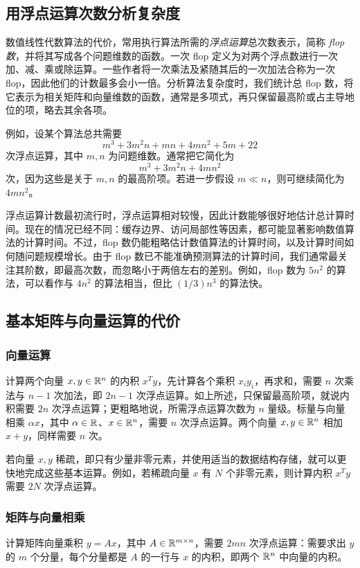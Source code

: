 \subsection{用浮点运算次数分析复杂度}
数值线性代数算法的代价，常用执行算法所需的\emph{浮点运算}总次数表示，简称 \emph{flop 数}，并将其写成各个问题维数的函数。一次 flop 定义为对两个浮点数进行一次加、减、乘或除运算。一些作者将一次乘法及紧随其后的一次加法合称为一次 flop，因此他们的计数最多会小一倍。分析算法复杂度时，我们统计总 flop 数，将它表示为相关矩阵和向量维数的函数，通常是多项式，再只保留最高阶或占主导地位的项，略去其余各项。

例如，设某个算法总共需要
\[
 m^3+3m^2n+mn+4mn^2+5m+22
\]
次浮点运算，其中 $m,n$ 为问题维数。通常把它简化为
\[
 m^3+3m^2n+4mn^2
\]
次，因为这些是关于 $m,n$ 的最高阶项。若进一步假设 $m\ll n$，则可继续简化为 $4mn^2$。

浮点运算计数最初流行时，浮点运算相对较慢，因此计数能够很好地估计总计算时间。现在的情况已经不同：缓存边界、访问局部性等因素，都可能显著影响数值算法的计算时间。不过，flop 数仍能粗略估计数值算法的计算时间，以及计算时间如何随问题规模增长。由于 flop 数已不能准确预测算法的计算时间，我们通常最关注其阶数，即最高次数，而忽略小于两倍左右的差别。例如，flop 数为 $5n^2$ 的算法，可以看作与 $4n^2$ 的算法相当，但比 $(1/3)n^3$ 的算法快。

\subsection{基本矩阵与向量运算的代价}
\subsubsection*{向量运算}
计算两个向量 $x,y\in\mathbb R^n$ 的内积 $x^Ty$，先计算各个乘积 $x_iy_i$，再求和，需要 $n$ 次乘法与 $n-1$ 次加法，即 $2n-1$ 次浮点运算。如上所述，只保留最高阶项，就说内积需要 $2n$ 次浮点运算；更粗略地说，所需浮点运算次数为 $n$ 量级。标量与向量相乘 $\alpha x$，其中 $\alpha\in\mathbb R$、$x\in\mathbb R^n$，需要 $n$ 次浮点运算。两个向量 $x,y\in\mathbb R^n$ 相加 $x+y$，同样需要 $n$ 次。

若向量 $x,y$ 稀疏，即只有少量非零元素，并使用适当的数据结构存储，就可以更快地完成这些基本运算。例如，若稀疏向量 $x$ 有 $N$ 个非零元素，则计算内积 $x^Ty$ 需要 $2N$ 次浮点运算。

\subsubsection*{矩阵与向量相乘}
计算矩阵向量乘积 $y=Ax$，其中 $A\in\mathbb R^{m\times n}$，需要 $2mn$ 次浮点运算：需要求出 $y$ 的 $m$ 个分量，每个分量都是 $A$ 的一行与 $x$ 的内积，即两个 $\mathbb R^n$ 中向量的内积。

